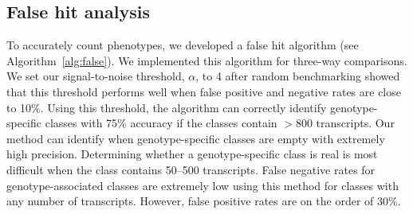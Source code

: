 \documentclass[8pt, twocolumn]{article}
\begin{document}

\subsection*{False hit analysis}
To accurately count phenotypes, we developed a false hit algorithm (see
Algorithm~\ref{alg:false}). We implemented this algorithm for three-way
comparisons. We set our signal-to-noise threshold, $\alpha$, to 4 after random
benchmarking showed that this threshold performs well when false positive
and negative rates are close to 10\%. Using this threshold, the algorithm can
correctly identify genotype-specific classes with 75\% accuracy if the classes
contain $>800$ transcripts. Our method can identify when genotype-specific
classes are empty with extremely high precision. Determining whether a
genotype-specific class is real is most difficult when the class contains
50--500 transcripts. False negative rates for genotype-associated classes are
extremely low using this method for classes with any number of transcripts.
However, false positive rates are on the order of 30\%. 
\end{document}
